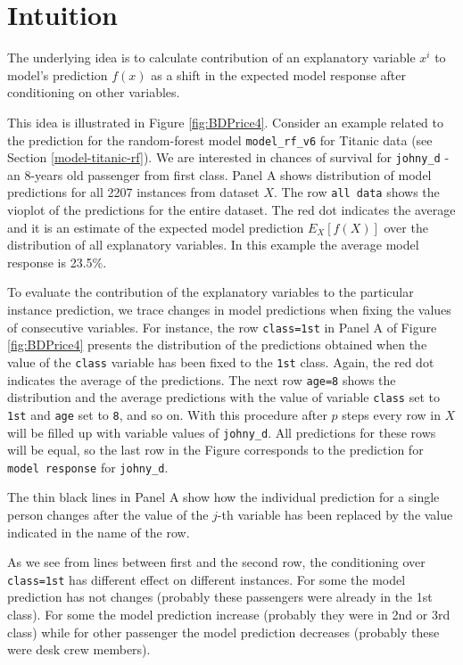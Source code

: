 \documentclass[]{krantz}
\begin{document}
\hypertarget{BDIntuition}{%
\section{Intuition}\label{BDIntuition}}

The underlying idea is to calculate contribution of an explanatory variable \(x^i\) to model's prediction \(f(x)\) as a shift in the expected model response after conditioning on other variables.

This idea is illustrated in Figure \ref{fig:BDPrice4}. Consider an example related to the prediction for the random-forest model \texttt{model\_rf\_v6} for Titanic data (see Section \ref{model-titanic-rf}). We are interested in chances of survival for \texttt{johny\_d} - an 8-years old passenger from first class. Panel A shows distribution of model predictions for all 2207 instances from dataset \(X\). The row \texttt{all\ data} shows the vioplot of the predictions for the entire dataset. The red dot indicates the average and it is an estimate of the expected model prediction \(E_X[f(X)]\) over the distribution of all explanatory variables. In this example the average model response is 23.5\%.

To evaluate the contribution of the explanatory variables to the particular instance prediction, we trace changes in model predictions when fixing the values of consecutive variables. For instance, the row \texttt{class=1st} in Panel A of Figure \ref{fig:BDPrice4} presents the distribution of the predictions obtained when the value of the \texttt{class} variable has been fixed to the \texttt{1st} class. Again, the red dot indicates the average of the predictions. The next row \texttt{age=8} shows the distribution and the average predictions with the value of variable \texttt{class} set to \texttt{1st} and \texttt{age} set to \texttt{8}, and so on. With this procedure after \(p\) steps every row in \(X\) will be filled up with variable values of \texttt{johny\_d}. All predictions for these rows will be equal, so the last row in the Figure corresponds to the prediction for \texttt{model\ response} for \texttt{johny\_d}.

The thin black lines in Panel A show how the individual prediction for a single person changes after the value of the \(j\)-th variable has been replaced by the value indicated in the name of the row.

As we see from lines between first and the second row, the conditioning over \texttt{class=1st} has different effect on different instances. For some the model prediction has not changes (probably these passengers were already in the 1st class). For some the model prediction increase (probably they were in 2nd or 3rd class) while for other passenger the model prediction decreases (probably these were desk crew members).
\end{document}
